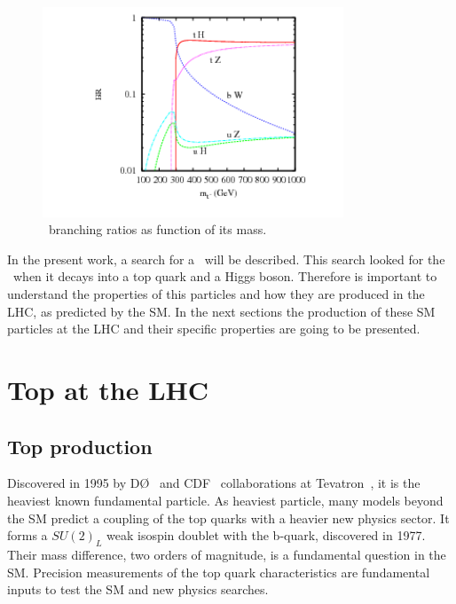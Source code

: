 \begin{figure}[!Hhtbp]
  \begin{center}
    \includegraphics[width=0.8\textwidth]{figs/pheno_br_tp.png}
    \caption{\Tp~branching ratios as function of its mass.}
    \label{fig:TBRs}
  \end{center}
\end{figure}

In the present work, a search for a \Tp~will be described. This search looked for the \Tp~when it decays into a top quark and a Higgs boson. Therefore is important to understand the properties of this particles and how they are produced in the LHC, as predicted by the SM. In the next sections the production of these SM particles at the LHC and their specific properties are going to be presented. %

\section{Top at the LHC}
\subsection{Top production}

Discovered in 1995 by D\O~\cite{Abazov:2002su} and CDF~\cite{Blair:1996kx} collaborations at Tevatron~\cite{Group:1984bk,Holmes:2011nq}, it is the heaviest known fundamental particle. As heaviest particle, many models beyond the SM predict a coupling of the top quarks with a heavier new physics sector. It forms a $SU(2)_{L}$ weak isospin doublet with the b-quark, discovered in 1977. Their mass difference, two orders of magnitude, is a fundamental question in the SM. Precision measurements of the top quark characteristics are fundamental inputs to test the SM and new physics searches.

